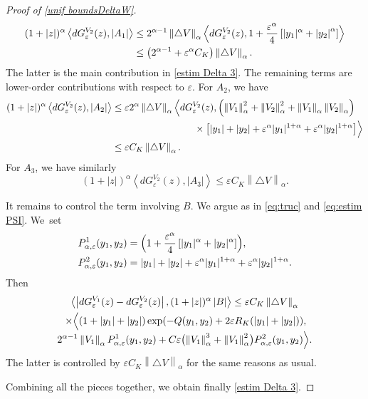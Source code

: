 \documentclass[10pt]{amsart}
\theoremstyle{plain}
\theoremstyle{definition}
\let\eps\varepsilon
\newcommand{\abs}[1]{\left\lvert#1\right\rvert}
\newcommand{\norm}[1]{\left\lVert#1\right\rVert}
\newcommand{\nalph}[1]{\left\lVert#1\right\rVert_\alpha}
\newcommand{\dQVA}{dG_\eps^{V_1}}
\newcommand{\dQVB}{dG_\eps^{V_2}}
\newcommand{\RK}{R_K}
\begin{document}
\begin{proof}[Proof of \cref{unif boundsDeltaW}]
\begin{align*}
(1+\abs{z})^\alpha \left\langle \dQVB(z), \abs{ A_1} \right \rangle &\leq 2^{\alpha - 1} \norm{\triangle V}_\alpha	\Bigl\langle \dQVB(z), 1 + \frac{\eps^\alpha}4 \left[\vert y_1 \vert^\alpha + \abs{y_2}^\alpha\right] \Bigr\rangle\\
& \leq \left (2^{\alpha - 1} + \eps^\alpha C_K\right) \norm{\triangle V}_\alpha.
\end{align*}
The latter is the main contribution in \eqref{estim Delta 3}. The remaining terms are lower-order contributions with respect to $\eps$.
For $A_2$, we have
\begin{align*}
(1+\abs{z})^\alpha \left\langle \dQVB(z), \abs{ A_2} \right \rangle &\leq \eps 2^{\alpha} \norm{\triangle V }_\alpha \Bigl\langle \dQVB(z), \left(\nalph{V_1}^2+\nalph{V_2}^2+ \nalph{V_1} \nalph{V_2} \right)\\
&\hspace*{3cm}\times\left[\vert y_1 \vert+ \vert y_2 \vert + \eps^\alpha \vert y_1 \vert^{1+\alpha} + \eps^\alpha\vert y_2 \vert^{1+\alpha} \right] \Bigr \rangle\\
& \leq \eps C_K \norm{\triangle V }_\alpha.
\end{align*}
For $A_3$, we have similarly
\begin{equation*}
(1+\abs{z})^\alpha \left\langle \dQVB(z), \abs{ A_3} \right \rangle \leq \eps C_K \norm{\triangle V }_\alpha.
\end{equation*}

It remains to control the term involving $B$. We argue as in \eqref{eq:truc} and \eqref{eq:estim PSI}. We~set
\begin{align*}
P^1_{\alpha,\eps}(y_1,y_2)&=\Bigl (1+ \frac{\eps^\alpha}4 \left[\vert y_1 \vert^{\alpha}+ \vert y_2 \vert^{\alpha} \right] \Bigr),\\
P^2_{\alpha,\eps}(y_1,y_2)&=\vert y_1 \vert+ \vert y_2 \vert + \eps^\alpha\vert y_1 \vert^{1+\alpha} + \eps^\alpha\vert y_2 \vert^{1+\alpha}.
\end{align*}
Then
\begin{multline*}
\left\langle \abs{ \dQVA(z)- \dQVB(z) }, (1+\abs{z})^\alpha\abs{B} \right\rangle
\leq \eps C_K \norm{\triangle V}_\alpha\\
\shoveleft{\times \Bigl\langle (1+ \abs{y_1} + \abs{y_2}) \exp (-Q(y_1,y_2) + 2\eps \RK(\abs{y_1}+\abs{y_2})),}\\[-3pt]
2^{\alpha-1} \norm{V_1}_\alpha P^1_{\alpha,\eps}(y_1,y_2)
+ C \eps \bigl (\norm{V_1}_\alpha^3 + \norm{V_1}_\alpha^2\bigr) P^2_{\alpha,\eps}(y_1,y_2)\Bigr\rangle.
\end{multline*}
The latter is controlled by $ \eps C_K \norm{\triangle V }_\alpha$ for the same reasons as usual.

Combining all the pieces together, we obtain finally \eqref{estim Delta 3}.
\end{proof}
\end{document}
